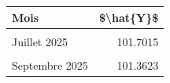 \centering
\centering
\begin{tabular}[t]{lr}
\toprule
Mois & \$\textbackslash{}hat\{Y\}\$\\
\midrule
\cellcolor{gray!10}{Juin 2025} & \cellcolor{gray!10}{101.7176}\\
Juillet 2025 & 101.7015\\
\cellcolor{gray!10}{Août 2025} & \cellcolor{gray!10}{101.3804}\\
Septembre 2025 & 101.3623\\
\bottomrule
\end{tabular}

